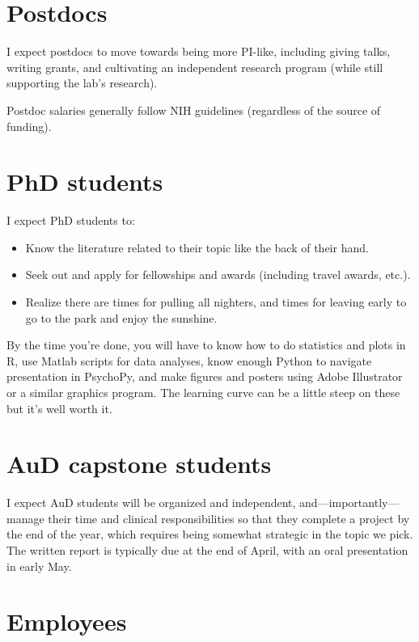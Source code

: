 \documentclass[letterpaper,12pt,oneside]{memoir}
\begin{document}
\section{Postdocs}

I expect postdocs to move towards being more PI-like, including  giving talks, writing grants, and cultivating an independent research program (while still supporting the lab's research). 


Postdoc salaries generally follow NIH guidelines (regardless of the source of funding).

\section{PhD students}

I expect PhD students to:

\begin{itemize}
\item Know the literature related to their topic like the back of their hand.
\item Seek out and apply for fellowships and awards (including travel awards, etc.).
\item Realize there are times for pulling all nighters, and times for leaving early to go to the park and enjoy the sunshine.
\end{itemize}

By the time you're done, you will have to know how to do statistics and plots in R, use Matlab scripts for data analyses, know enough Python to navigate presentation in PsychoPy, and  make figures and posters using Adobe Illustrator or a similar graphics program. The learning curve can be a little steep on these but it's well worth it.

\section{AuD capstone students}
I expect AuD students will be organized and independent, and---importantly---manage their time and clinical responsibilities so that they complete a project by the end of the year, which requires being somewhat strategic in the topic we pick. The written report is typically due at the end of April, with an oral presentation in early May.

\section{Employees}
\end{document}

